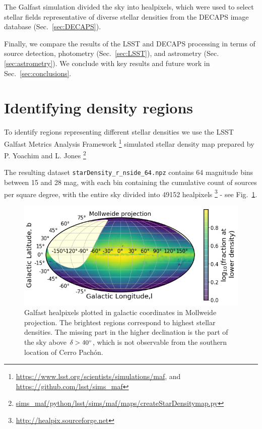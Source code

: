 \documentclass[DM,lsstdraft,toc,usenatbib]{lsstdoc}
\begin{document}
The Galfast simulation divided the sky into healpixels, which were used to select stellar fields representative of diverse stellar densities from the DECAPS image database (Sec.~\ref{sec:DECAPS}). 

Finally, we compare the results of the LSST and DECAPS processing in terms of source detection, photometry (Sec.~\ref{sec:LSST}), and astrometry (Sec.\ref{sec:astrometry}). We conclude with key results and future work in Sec.~\ref{sec:conclusions}. 



\section{Identifying density regions}
\label{sec:MAF}
To identify regions representing different stellar densities we use the LSST Galfast Metrics Analysis Framework \footnote{\url{https://www.lsst.org/scientists/simulations/maf}, and \url{https://github.com/lsst/sims_maf}} simulated stellar density map prepared by P. Yoachim and L. Jones
\footnote{\url{sims_maf/python/lsst/sims/maf/maps/createStarDensitymap.py}}

The  resulting dataset \verb|starDensity_r_nside_64.npz| contains 64 magnitude bins between 15 and 28 mag, with each bin containing the cumulative count of sources per square degree, with the entire sky divided into 49152  healpixels \footnote{\url{http://healpix.sourceforge.net}} - see Fig.~\ref{fig:MAF_densities}.

\begin{figure}
\includegraphics[width=1.0\columnwidth]{figs/01_MAF_densities.png}
\caption{Galfast healpixels plotted in galactic coordinates in Mollweide projection. The brightest regions correspond to highest stellar densities. The missing part in the higher declination is the part of the sky above $\delta>40 \degree$, which is not observable from the southern location of Cerro Pach\'on.}
\label{fig:MAF_densities}
\end{figure} 
\end{document}
